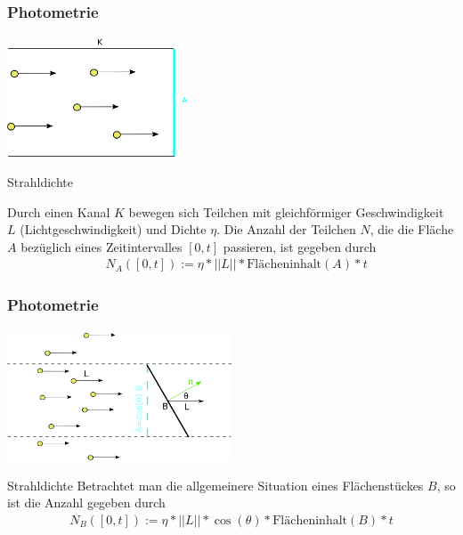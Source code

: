 \documentclass{beamer}
\begin{document}
\begin{frame}
    \frametitle{Photometrie}
\framesubtitle{}
\begin{center}
    \includegraphics[width=0.4\textwidth]{images/Partikelstrom.png}
\end{center}
\begin{block}{ Strahldichte}

Durch einen Kanal $K$ bewegen  sich Teilchen mit gleichförmiger Geschwindigkeit $L$ (Lichtgeschwindigkeit)  und  Dichte $\eta$.
Die Anzahl der Teilchen $N$, die die Fläche $A$ bezüglich eines Zeitintervalles $[0,t]$ passieren, ist gegeben durch
\begin{align}
& N_A([0,t]) := \eta * ||L||  *   \text{Flächeninhalt}(A) *   t 
\end{align}
\end{block}
\end{frame}

\begin{frame}
    \frametitle{Photometrie}
\framesubtitle{}

\begin{center}

    \includegraphics[width=0.5\textwidth]{images/Strahldichte.png}
\end{center}


\begin{block}{Strahldichte}
 Betrachtet man die allgemeinere Situation eines Flächenstückes $B$, so ist die Anzahl gegeben durch 
\begin{align}
N_B([0,t]) := \eta * ||L||  * \cos(\theta) *  \text{Flächeninhalt} (B) * t
 \end{align}


\end{block}
\end{frame}
\end{document}
